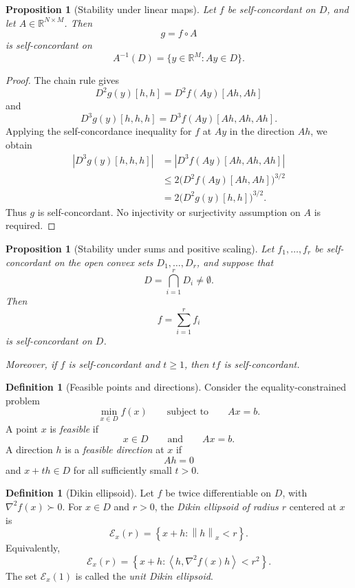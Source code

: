 \documentclass[a4paper,11pt]{book}
\theoremstyle{plain}
\newtheorem{proposition}[theorem]{Proposition}
\theoremstyle{definition}
\newtheorem{definition}[theorem]{Definition}
\theoremstyle{remark}
\numberwithin{equation}{chapter}
\numberwithin{algorithm}{chapter}
\newcommand{\R}{\mathbb{R}}
\newcommand{\norm}[1]{\left\|#1\right\|}
\newcommand{\inner}[2]{\left\langle #1, #2 \right\rangle}
\begin{document}
	\begin{proposition}[Stability under linear maps]
		Let \(f\) be self-concordant on \(D\), and let
		\(A\in\R^{N\times M}\). Then
		\[
		g=f\circ A
		\]
		is self-concordant on
		\[
		A^{-1}(D)=\{y\in\R^M:Ay\in D\}.
		\]
	\end{proposition}
	
	\begin{proof}
		The chain rule gives
		\[
		D^2g(y)[h,h]
		=
		D^2f(Ay)[Ah,Ah]
		\]
		and
		\[
		D^3g(y)[h,h,h]
		=
		D^3f(Ay)[Ah,Ah,Ah].
		\]
		Applying the self-concordance inequality for \(f\) at \(Ay\) in the
		direction \(Ah\), we obtain
		\begin{align}
			\left|D^3g(y)[h,h,h]\right|
			&=
			\left|D^3f(Ay)[Ah,Ah,Ah]\right|\\
			&\leq
			2\bigl(D^2f(Ay)[Ah,Ah]\bigr)^{3/2}\\
			&=
			2\bigl(D^2g(y)[h,h]\bigr)^{3/2}.
		\end{align}
		Thus \(g\) is self-concordant. No injectivity or surjectivity assumption on
		\(A\) is required.
	\end{proof}
	
	\begin{proposition}[Stability under sums and positive scaling]
		Let \(f_1,\ldots,f_r\) be self-concordant on the open convex sets
		\(D_1,\ldots,D_r\), and suppose that
		\[
		D=\bigcap_{i=1}^rD_i\neq\emptyset.
		\]
		Then
		\[
		f=\sum_{i=1}^rf_i
		\]
		is self-concordant on \(D\).
		
		Moreover, if \(f\) is self-concordant and \(t\geq1\), then \(tf\) is
		self-concordant.
	\end{proposition}
	
	
	
	
	\begin{definition}[Feasible points and directions]
		Consider the equality-constrained problem
		\[
		\min_{x\in D}f(x)
		\qquad
		\text{subject to}
		\qquad
		Ax=b.
		\]
		A point \(x\) is \emph{feasible} if
		\[
		x\in D
		\qquad\text{and}\qquad
		Ax=b.
		\]
		A direction \(h\) is a \emph{feasible direction} at \(x\) if
		\[
		Ah=0
		\]
		and \(x+th\in D\) for all sufficiently small \(t>0\).
	\end{definition}
	
	\begin{definition}[Dikin ellipsoid]
		Let \(f\) be twice differentiable on \(D\), with
		\(\nabla^2f(x)\succ0\). For \(x\in D\) and \(r>0\), the \emph{Dikin
			ellipsoid of radius \(r\)} centered at \(x\) is
		\begin{equation}
			\mathcal E_x(r)
			=
			\left\{
			x+h:
			\norm{h}_x<r
			\right\}.
		\end{equation}
		Equivalently,
		\[
		\mathcal E_x(r)
		=
		\left\{
		x+h:
		\inner{h}{\nabla^2f(x)h}<r^2
		\right\}.
		\]
		The set \(\mathcal E_x(1)\) is called the \emph{unit Dikin ellipsoid}.
	\end{definition}
	
\end{document}
